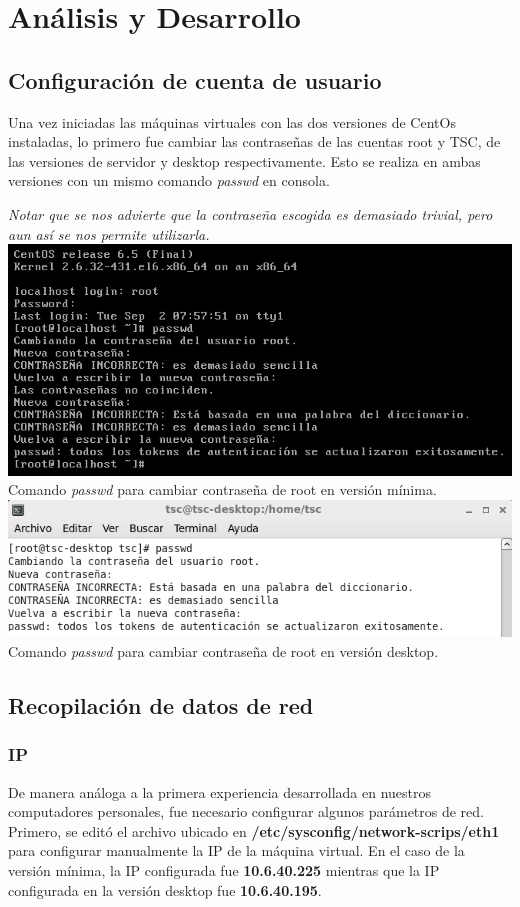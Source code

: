 \documentclass[11pt]{article}
\begin{document}
\section{Análisis y Desarrollo}
\subsection{Configuración de cuenta de usuario}
Una vez iniciadas las máquinas virtuales con las dos versiones de CentOs instaladas, lo primero fue cambiar las contraseñas de las cuentas root y TSC, de las versiones de servidor y desktop respectivamente. Esto se realiza en ambas versiones con un mismo comando \textit{passwd} en consola.\par
\textit{Notar que se nos advierte que la contraseña escogida es demasiado trivial, pero aun así se nos permite utilizarla.}\\
	
\includegraphics[width=.75\linewidth]{screenshots/minimal/passwd.png}
    \\Comando \textit{passwd} para cambiar contraseña de root en versión mínima.\\

\includegraphics[width=.75\linewidth]{screenshots/desktop/passwd.png}
    \\Comando \textit{passwd} para cambiar contraseña de root en versión desktop.\\
\newpage
\subsection{Recopilación de datos de red}
\subsubsection{IP}
De manera análoga a la primera experiencia desarrollada en nuestros computadores personales, fue necesario configurar algunos parámetros de red. Primero, se editó el archivo ubicado en \textbf{/etc/sysconfig/network-scrips/eth1} para configurar manualmente la IP de la máquina virtual. En el caso de la versión mínima, la IP configurada fue \textbf{10.6.40.225} mientras que la IP configurada en la versión desktop fue \textbf{10.6.40.195}.\\
\end{document}
